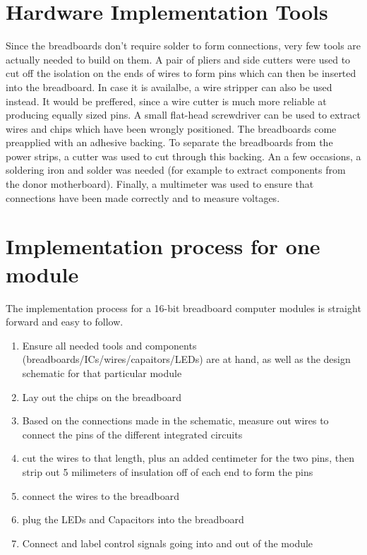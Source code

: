  \section{Hardware Implementation Tools}
 Since the breadboards don't require solder to form connections, very few tools are actually
 needed to build on them. A pair of pliers and side cutters were used to cut off the isolation
 on the ends of wires to form pins which can then be inserted into the breadboard. In case it is
 availalbe, a wire stripper can also be used instead. It would be preffered, since a wire cutter
 is much more reliable at producing equally sized pins.
 A small flat-head screwdriver can be used to extract wires and chips which have been wrongly
 positioned. The breadboards come preapplied with an adhesive backing. To separate the breadboards
 from the power strips, a cutter was used to cut through this backing.
 An a few occasions, a soldering iron and solder was needed (for example to extract components
 from the donor motherboard). Finally, a multimeter was used to ensure that connections have been
 made correctly and to measure voltages.

 \section{Implementation process for one module}
The implementation process for a 16-bit breadboard computer modules is straight forward and easy
to follow.
\begin{enumerate}
  \item Ensure all needed tools and components (breadboards/ICs/wires/capaitors/LEDs) are at
  hand, as well as the design schematic for that particular module
  \item Lay out the chips on the breadboard
  \item Based on the connections made in the schematic, measure out wires to connect the pins of
  the different integrated circuits
  \item cut the wires to that length, plus an added centimeter for the two pins, then strip out
  5 milimeters of insulation off of each end to form the pins
  \item connect the wires to the breadboard
  \item plug the LEDs and Capacitors into the breadboard
  \item Connect and label control signals going into and out of the module
\end{enumerate}

